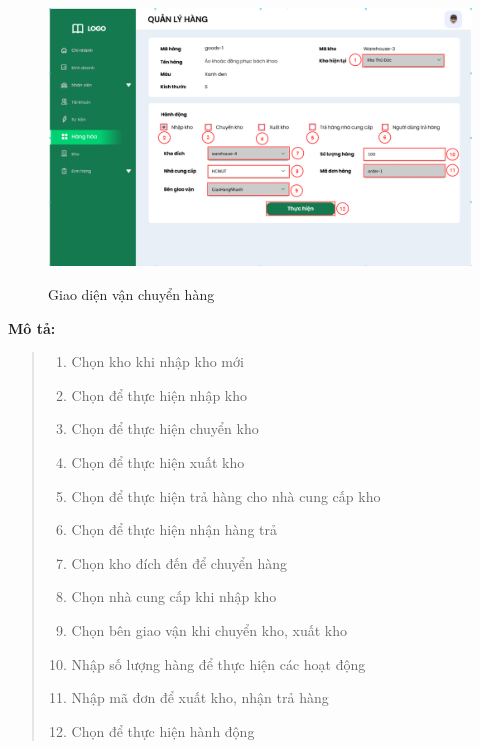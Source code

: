         \newpage
            \begin{figure}[!htp]
                \centering
                \includegraphics[width=12cm]{img/UI/admin/Goods_tranfer.png}
                \label{39}
                \newline
                \caption{Giao diện vận chuyển hàng}
            \end{figure}
            \textbf{Mô tả:}  
            \begin{quote}
                \begin{enumerate}
                    \item Chọn kho khi nhập kho mới
                    \item Chọn để thực hiện nhập kho
                    \item Chọn để thực hiện chuyển kho
                    \item Chọn để thực hiện xuất kho
                    \item Chọn để thực hiện trả hàng cho nhà cung cấp kho
                    \item Chọn để thực hiện nhận hàng trả
                    \item Chọn kho đích đến để chuyển hàng
                    \item Chọn nhà cung cấp khi nhập kho
                    \item Chọn bên giao vận khi chuyển kho, xuất kho
                    \item Nhập số lượng hàng để thực hiện các hoạt động
                    \item Nhập mã đơn để xuất kho, nhận trả hàng
                    \item Chọn để thực hiện hành động
                \end{enumerate}
            \end{quote}
        
